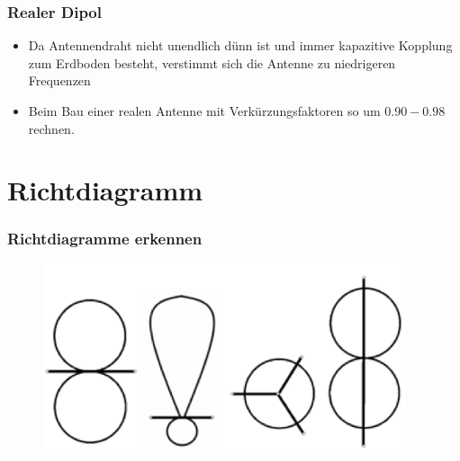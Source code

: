 \begin{frame}
  \frametitle{Realer Dipol}
  \begin{center}
    \begin{itemize}
      \item Da Antennendraht nicht unendlich dünn ist und immer kapazitive Kopplung zum Erdboden besteht, verstimmt sich die Antenne zu niedrigeren Frequenzen
      \item Beim Bau einer realen Antenne mit Verkürzungsfaktoren so um $0.90-0.98$ rechnen.
    \end{itemize}
  \end{center}
\end{frame}

\section*{Richtdiagramm}

\begin{frame}
  \frametitle{Richtdiagramme erkennen}
  \begin{center}
    \begin{figure}
      \includegraphics[width=0.95\textwidth,height=.75\textheight,keepaspectratio]{a09/Abstrahl.png}
    \end{figure}
  \end{center}
\end{frame}

